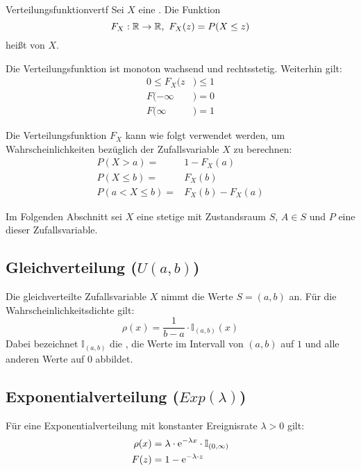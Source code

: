 \begin{definition}{Verteilungsfunktion}{vertf}
Sei $X$ eine . Die Funktion
\[F_X:\mathbb{R}\to\mathbb{R},\ F_X(z) = P(X \le z)\]
heißt  von $X$.
\end{definition}

Die Verteilungsfunktion ist monoton wachsend und rechtsstetig. Weiterhin gilt:
\begin{align*}
0\le F_X(z&)\le 1 \\
F(-\infty&) = 0 \\
F(\infty&) = 1
\end{align*}

Die Verteilungsfunktion $F_X$ kann wie folgt verwendet werden, um
Wahrscheinlichkeiten bezüglich der Zufallsvariable $X$ zu berechnen:
\begin{align*}
P(X>a) = &1 - F_X(a) \\
P(X\le b) = &F_X(b) \\
P(a < X \le b) = &F_X(b) - F_X(a)
\end{align*}

Im Folgenden Abschnitt sei $X$ eine stetige 
mit Zustandsraum $S$, $A \in S$ und $P$ eine
 dieser Zufallsvariable.


\subsection{Gleichverteilung ($U(a,b)$)}
\label{vert-gleich}

Die gleichverteilte Zufallsvariable $X$ nimmt die Werte $S=(a,b)$ an. Für die
Wahrscheinlichkeitsdichte gilt:
\[
\rho(x) = \frac{1}{b-a}\cdot\mathbb{I}_{(a,b)}(x)
\]
Dabei bezeichnet $\mathbb{I}_{(a,b)}$ die , die Werte im
Intervall von $(a,b)$ auf $1$ und alle anderen Werte auf $0$ abbildet.

\subsection{Exponentialverteilung ($Exp(\lambda)$)}
\label{vert-exp}

Für eine Exponentialverteilung mit konstanter Ereignisrate $\lambda>0$ gilt:
\begin{align*}
\rho(x) &= \lambda\cdot \mathrm{e}^{-\lambda x}\cdot\mathbb{I}_{(0, \infty)} \\
F(z) &= 1 - \mathrm{e}^{-\lambda\cdot z}
\end{align*}


